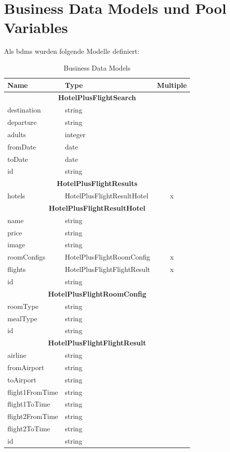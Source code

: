 \section{Business Data Models und Pool Variables}
Als \glspl{bdm} wurden folgende Modelle definiert:
\begin{table}[H] 
	\caption{Business Data Models}
	\centering
	\label{sec:umsetzung:bdm:bdm}
	
	\begin{tabular}{ | l | l | c | } 
		\hline
		\textbf{Name} & \textbf{Type} & \textbf{Multiple} \\ \hline 
		\multicolumn{3}{|c|}{\textbf{HotelPlusFlightSearch}} \\ \hline 
		destination & string & \\ \hline
		departure & string & \\ \hline
		adults & integer & \\ \hline
		fromDate & date & \\ \hline
		toDate & date & \\ \hline
		id & string & \\ \hline
		\multicolumn{3}{|c|}{\textbf{HotelPlusFlightResults}} \\ \hline 
		hotels & HotelPlusFlightResultHotel & x \\ \hline
		\multicolumn{3}{|c|}{\textbf{HotelPlusFlightResultHotel}} \\ \hline 
		name & string & \\ \hline
		price & string & \\ \hline
		image & string & \\ \hline
		roomConfigs & HotelPlusFlightRoomConfig & x \\ \hline
		flights & HotelPlusFlightFlightResult & x \\ \hline
		id & string & \\ \hline
		\multicolumn{3}{|c|}{\textbf{HotelPlusFlightRoomConfig}} \\ \hline 
		roomType & string & \\ \hline
		mealType & string & \\ \hline
		id & string & \\ \hline
		\multicolumn{3}{|c|}{\textbf{HotelPlusFlightFlightResult}} \\ \hline 
		airline & string & \\ \hline
		fromAirport & string & \\ \hline
		toAirport & string & \\ \hline
		flight1FromTime & string & \\ \hline
		flight1ToTime & string & \\ \hline
		flight2FromTime & string & \\ \hline
		flight2ToTime & string & \\ \hline
		id & string & \\ \hline
	\end{tabular} 
\end{table}


